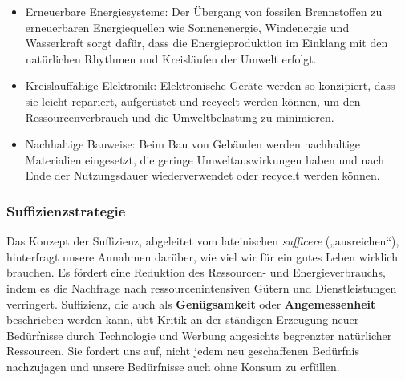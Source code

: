 \documentclass[
  letterpaper,
  DIV=11,
  numbers=noendperiod]{scrartcl}
\providecommand{\tightlist}{%
  \setlength{\itemsep}{0pt}\setlength{\parskip}{0pt}}\usepackage{longtable,booktabs,array}
\begin{document}
\begin{tcolorbox}[enhanced jigsaw, opacitybacktitle=0.6, breakable, left=2mm, colback=white, leftrule=.75mm, colbacktitle=quarto-callout-tip-color!10!white, bottomrule=.15mm, toprule=.15mm, titlerule=0mm, title=\textcolor{quarto-callout-tip-color}{\faLightbulb}\hspace{0.5em}{Umsetzung der Konsistenzstrategie: Beispiele}, colframe=quarto-callout-tip-color-frame, bottomtitle=1mm, opacityback=0, arc=.35mm, toptitle=1mm, rightrule=.15mm, coltitle=black]

\begin{itemize}
\tightlist
\item
  Erneuerbare Energiesysteme: Der Übergang von fossilen Brennstoffen zu
  erneuerbaren Energiequellen wie Sonnenenergie, Windenergie und
  Wasserkraft sorgt dafür, dass die Energieproduktion im Einklang mit
  den natürlichen Rhythmen und Kreisläufen der Umwelt erfolgt.
\item
  Kreislauffähige Elektronik: Elektronische Geräte werden so konzipiert,
  dass sie leicht repariert, aufgerüstet und recycelt werden können, um
  den Ressourcenverbrauch und die Umweltbelastung zu minimieren.
\item
  Nachhaltige Bauweise: Beim Bau von Gebäuden werden nachhaltige
  Materialien eingesetzt, die geringe Umweltauswirkungen haben und nach
  Ende der Nutzungsdauer wiederverwendet oder recycelt werden können.
\end{itemize}

\end{tcolorbox}

\subsubsection{Suffizienzstrategie}\label{suffizienzstrategie}

Das Konzept der Suffizienz, abgeleitet vom lateinischen \emph{sufficere}
(„ausreichen``), hinterfragt unsere Annahmen darüber, wie viel wir für
ein gutes Leben wirklich brauchen. Es fördert eine Reduktion des
Ressourcen- und Energieverbrauchs, indem es die Nachfrage nach
ressourcenintensiven Gütern und Dienstleistungen verringert. Suffizienz,
die auch als \textbf{Genügsamkeit} oder \textbf{Angemessenheit}
beschrieben werden kann, übt Kritik an der ständigen Erzeugung neuer
Bedürfnisse durch Technologie und Werbung angesichts begrenzter
natürlicher Ressourcen. Sie fordert uns auf, nicht jedem neu
geschaffenen Bedürfnis nachzujagen und unsere Bedürfnisse auch ohne
Konsum zu erfüllen.
\end{document}
